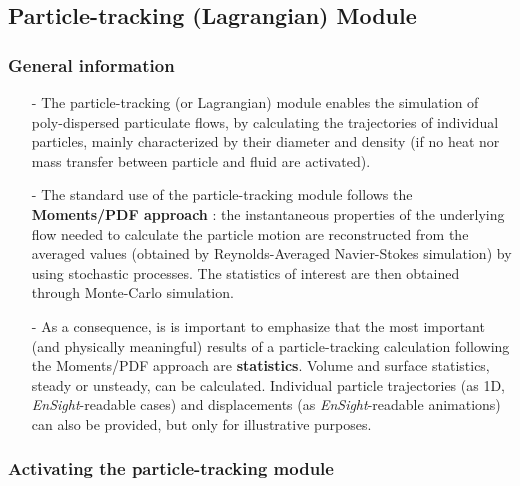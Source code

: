 {{%
\subsection{Particle-tracking (Lagrangian) Module}

\subsubsection{General information}\label{sec:over-lag}

\begin{itemize}

\item[-] The particle-tracking (or Lagrangian) module enables the simulation of poly-dispersed particulate flows, by calculating the trajectories of individual particles, mainly characterized by their diameter and density (if no heat nor mass transfer between particle and fluid are activated).

\item[-] The standard use of the particle-tracking module follows the \textbf{Moments/PDF approach} : the instantaneous properties of the underlying flow needed to calculate the particle motion are reconstructed from the averaged values (obtained by Reynolds-Averaged Navier-Stokes simulation) by using stochastic processes. The statistics of interest are then obtained through Monte-Carlo simulation.

\item[-] As a consequence, is is important to emphasize that the most important (and physically meaningful) results of a particle-tracking calculation following the Moments/PDF approach are \mbox{\textbf{statistics}}. Volume and surface statistics, steady or unsteady, can be calculated. Individual particle trajectories (as 1D, \textit{EnSight}-readable cases) and displacements (as \textit{EnSight}-readable animations) can also be provided, but only for illustrative purposes.

\end{itemize}

\subsubsection{Activating the particle-tracking module}\label{sec:acti-lag}

}}

